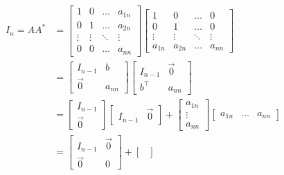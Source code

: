 \documentclass[answers]{exam}
\begin{document}
\begin{questions}
\begin{parts}
\begin{solution}
            \begin{align*}
                I_n = AA^* &= \begin{bmatrix}
                    1 & 0 & \dots & a_{1n} \\
                    0 & 1 & \dots & a_{2n} \\
                    \vdots &\vdots&\ddots & \vdots \\
                    0 & 0 & \dots & a_{nn}
                \end{bmatrix}\begin{bmatrix}
                    1 & 0 & \dots & 0 \\
                    0 & 1 & \dots & 0 \\
                    \vdots & \vdots & \ddots & \vdots \\
                    a_{1n} & a_{2n} & \dots & a_{nn}
                \end{bmatrix} \\
                &= \begin{bmatrix}
                    I_{n-1} & b \\
                    \vec{0} & a_{nn}
                \end{bmatrix}\begin{bmatrix}
                    I_{n-1} & \vec{0} \\
                    {b}^\top & {a_{nn}}
                \end{bmatrix} \\
                &= \begin{bmatrix} I_{n-1} \\ \vec{0} \end{bmatrix} 
                   \begin{bmatrix} I_{n-1} & \vec{0} \end{bmatrix} + 
                   \begin{bmatrix} a_{1n}\\\vdots\\a_{nn} \end{bmatrix}
                       \begin{bmatrix} {a_{1n}}&\dots&{a_{nn}}\end{bmatrix}\\
                &= \begin{bmatrix} I_{n-1} & \vec{0} \\
                    \vec{0} & 0\end{bmatrix} + 
                    \begin{bmatrix}

\end{bmatrix}
\end{align*}
\end{solution}
\end{parts}
\end{questions}
\end{document}
